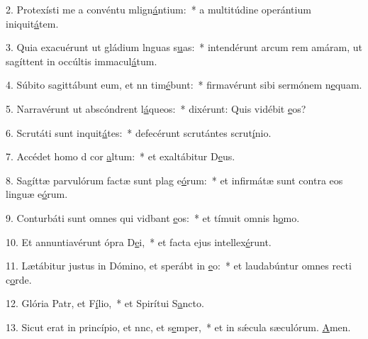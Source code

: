 2. Protexísti me a convéntu mlign\uline{á}ntium:~* a multitúdine operántium iniquit\uline{á}tem.\par 
3. Quia exacuérunt ut gládium lnguas s\uline{u}as:~* intendérunt arcum rem amáram, ut sagíttent in occúltis immacul\uline{á}tum.\par 
4. Súbito sagittábunt eum, et nn tim\uline{é}bunt:~* firmavérunt sibi sermónem n\uline{e}quam.\par 
5. Narravérunt ut abscóndrent l\uline{á}queos:~* dixérunt: Quis vidébit \uline{e}os?\par 
6. Scrutáti sunt inquit\uline{á}tes:~* defecérunt scrutántes scrut\uline{í}nio.\par 
7. Accédet homo d cor \uline{a}ltum:~* et exaltábitur D\uline{e}us.\par 
8. Sagíttæ parvulórum factæ sunt plag e\uline{ó}rum:~* et infirmátæ sunt contra eos linguæ e\uline{ó}rum.\par 
9. Conturbáti sunt omnes qui vidbant \uline{e}os:~* et tímuit omnis h\uline{o}mo.\par 
10. Et annuntiavérunt ópra D\uline{e}i,~* et facta ejus intellex\uline{é}runt.\par 
11. Lætábitur justus in Dómino, et sperábt in \uline{e}o:~* et laudabúntur omnes recti c\uline{o}rde.\par 
12. Glória Patr, et F\uline{í}lio,~* et Spirítui S\uline{a}ncto.\par 
13. Sicut erat in princípio, et nnc, et s\uline{e}mper,~* et in sǽcula sæculórum. \uline{A}men.\par 
